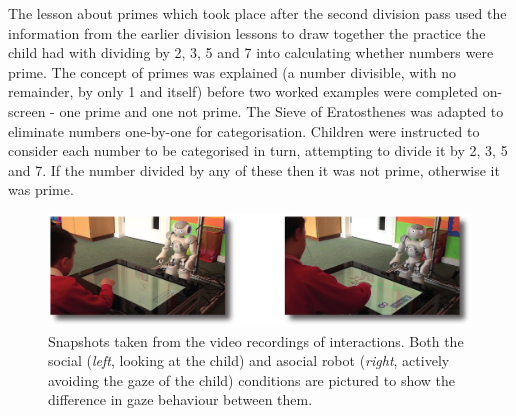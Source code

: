 The lesson about primes which took place after the second division pass used the information from the earlier division lessons to draw together the practice the child had with dividing by 2, 3, 5 and 7 into calculating whether numbers were prime. The concept of primes was explained (a number divisible, with no remainder, by only 1 and itself) before two worked examples were completed on-screen - one prime and one not prime. The Sieve of Eratosthenes was adapted to eliminate numbers one-by-one for categorisation. Children were instructed to consider each number to be categorised in turn, attempting to divide it by 2, 3, 5 and 7. If the number divided by any of these then it was not prime, otherwise it was prime.

\begin{figure}[t!]
    \centering
    \includegraphics[width=1.0\textwidth]{images/ch7_snapshots_small_compressed.pdf}
    \caption{Snapshots taken from the video recordings of interactions. Both the social (\textit{left}, looking at the child) and asocial robot (\textit{right}, actively avoiding the gaze of the child) conditions are pictured to show the difference in gaze behaviour between them.}
    \label{fig:ch7_conditionsnaps}
\end{figure}

